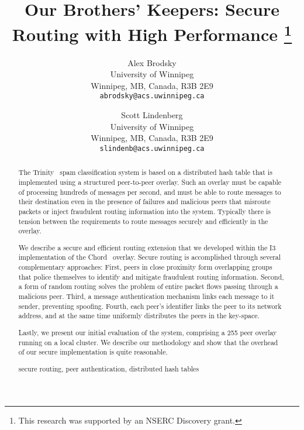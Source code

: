 \documentclass[11pt]{article}
\begin{document}
\newcommand{\ignore}[1]{}

\title{Our Brothers' Keepers: Secure Routing with High Performance
       \thanks{This research was supported by an NSERC Discovery grant.}}

\author{
    Alex Brodsky\\
    University of Winnipeg \\
    Winnipeg, MB, Canada, R3B 2E9\\
    {\tt abrodsky@acs.uwinnipeg.ca}
\and
    Scott Lindenberg\\
    University of Winnipeg \\
    Winnipeg, MB, Canada, R3B 2E9\\
    {\tt slindenb@acs.uwinnipeg.ca}
}

\maketitle
\begin{abstract}
  The Trinity~\cite{BrBr07} spam classification system is based on a
  distributed hash table that is implemented using a structured
  peer-to-peer overlay.  Such an overlay must be capable of processing
  hundreds of messages per second, and must be able to route messages
  to their destination even in the presence of failures and malicious
  peers that misroute packets or inject fraudulent routing information
  into the system.  Typically there is tension between the requirements
  to route messages securely and efficiently in the overlay.

  We describe a secure and efficient routing extension that we
  developed within the I3~\cite{StAdZhShSu04} implementation of the
  Chord~\cite{StMoKaKaBa01} overlay.  Secure routing is accomplished
  through several complementary approaches: First, peers in close
  proximity form overlapping groups that police themselves to identify
  and mitigate fraudulent routing information.  Second, a form of
  random routing solves the problem of entire packet flows passing
  through a malicious peer.  Third, a message authentication mechanism
  links each message to it sender, preventing spoofing.  Fourth, each
  peer's identifier links the peer to its network address, and at the
  same time uniformly distributes the peers in the key-space.

  Lastly, we present our initial evaluation of the system, comprising
  a 255 peer overlay running on a local cluster.  We describe our
  methodology and show that the overhead of our secure implementation
  is quite reasonable.

\vspace*{2ex}
 secure routing, peer authentication, 
                          distributed hash tables
\end{abstract}
\end{document}
